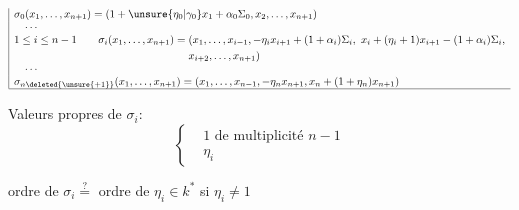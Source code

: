 \[
\begin{array}{|l}
\sigma_0(x_1,\ldots,x_{n+1})=(1+\unsure{\eta_0|\gamma_0}x_1+\alpha_0\Sigma_0,x_2,\ldots,x_{n+1})\\
\quad\cdots\\
\begin{aligned}
1\leq i\leq n-1\qquad\sigma_i(x_1,\ldots,x_{n+1})={}&(x_1,\ldots,x_{i-1},-\eta_i x_{i+1}+(1+\alpha_i)\Sigma_i,\ x_i+(\eta_i+1)x_{i+1}-(1+\alpha_i)\Sigma_i,\\
&x_{i+2},\ldots,x_{n+1})
\end{aligned}\\
\quad\cdots\\
\sigma_{n\deleted{\unsure{+1}}}(x_1,\ldots,x_{n+1})=(x_1,\ldots,x_{n-1},-\eta_nx_{n+1},x_n+(1+\eta_n)x_{n+1})\\\hline
\end{array}
\]

Valeurs propres de $\sigma_i$:
\[
\left\{\begin{aligned}&1\text{ de multiplicité }n-1\\&\eta_i\end{aligned}\right.
\]

ordre de $\sigma_i\overset{?}{=}$ ordre de $\eta_i\in k^*$ si $\eta_i\ne1$
